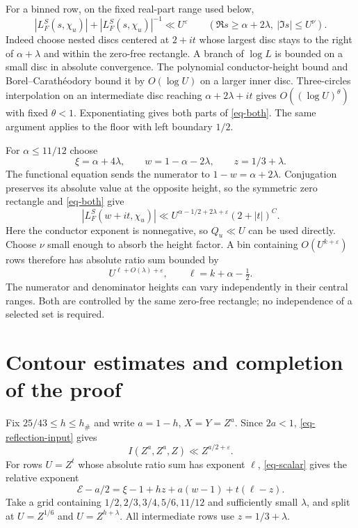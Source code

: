 \documentclass[11pt,a4paper]{article}
\numberwithin{equation}{section}
\theoremstyle{remark}
\newcommand{\eps}{\varepsilon}
\begin{document}
For a binned row, on the fixed real-part range used below,
\begin{equation}\label{eq-both}
 |L_F^S(s,\chi_u)|+|L_F^S(s,\chi_u)|^{-1}\ll U^\eps
 \qquad(\Re s\ge\alpha+2\lambda,\ |\Im s|\le U^\nu).
\end{equation}
Indeed choose nested discs centered at $2+it$ whose largest disc
stays to the right of $\alpha+\lambda$ and within the zero-free
rectangle.  A branch of $\log L$ is bounded on a small disc in
absolute convergence.  The polynomial conductor-height bound and
Borel--Carath\'eodory bound it by $O(\log U)$ on a larger inner
disc.  Three-circles interpolation on an intermediate disc reaching
$\alpha+2\lambda+it$ gives $O((\log U)^\theta)$ with fixed
$\theta<1$.  Exponentiating gives both parts of \eqref{eq-both}.
The same argument applies to the floor with left boundary $1/2$.

For $\alpha\le11/12$ choose
\begin{equation}\label{eq-bin-lines}
 \xi=\alpha+4\lambda,\qquad
 w=1-\alpha-2\lambda,\qquad z=1/3+\lambda.
\end{equation}
The functional equation sends the numerator to $1-w=\alpha+2\lambda$.
Conjugation preserves its absolute value at the opposite height,
so the symmetric zero rectangle and \eqref{eq-both} give
\[
 |L_F^S(w+it,\chi_u)|
 \ll U^{\alpha-1/2+2\lambda+\eps}(2+|t|)^C.
\]
Here the conductor exponent is nonnegative, so $Q_u\ll U$ can
be used directly.  Choose $\nu$ small enough to absorb the height
factor.  A bin containing $O(U^{k+\eps})$ rows therefore has
absolute ratio sum bounded by
\begin{equation}\label{eq-ratio-sum}
 U^{\ell+O(\lambda)+\eps},\qquad
 \ell=k+\alpha-\tfrac12.
\end{equation}
The numerator and denominator heights can vary independently in
their central ranges.  Both are controlled by the same zero-free
rectangle; no independence of a selected set is required.

\section{Contour estimates and completion of the proof}

Fix $25/43\le h\le h_\#$ and write $a=1-h$, $X=Y=Z^a$.
Since $2a<1$, \eqref{eq-reflection-input} gives
\begin{equation}\label{eq-probe-bound}
 I(Z^a,Z^a,Z)\ll Z^{a/2+\eps}.
\end{equation}
For rows $U=Z^t$ whose absolute ratio sum has exponent $\ell$,
\eqref{eq-scalar} gives the relative exponent
\begin{equation}\label{eq-ledger}
 \mathcal E-a/2=\xi-1+hz+a(w-1)+t(\ell-z).
\end{equation}
Take a grid containing $1/2,2/3,3/4,5/6,11/12$ and sufficiently
small $\lambda$, and split at $U=Z^{1/6}$ and $U=Z^{h+\lambda}$.
All intermediate rows use $z=1/3+\lambda$.
\end{document}
